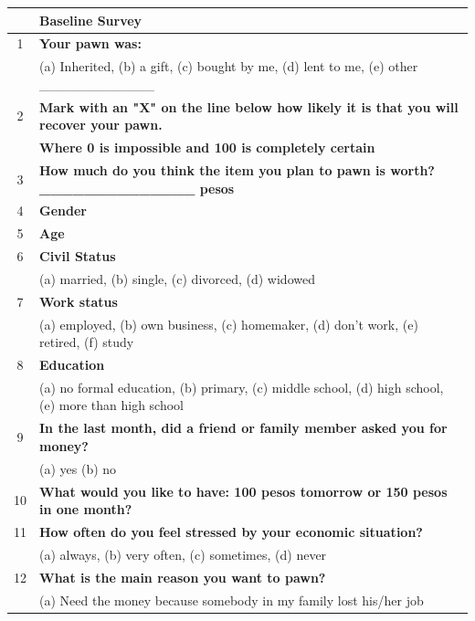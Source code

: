 \begin{tabular}{cl}
\toprule
      & \textbf{Baseline Survey} \\
\midrule
\midrule
1     & \textbf{Your pawn was:} \\
      & (a) Inherited, (b) a gift, (c) bought by me, (d) lent to me, (e) other \_\_\_\_\_\_\_\_\_\_\_\_ \\
\rowcolor[rgb]{ .682,  .667,  .667} 2     & \textbf{Mark with an "X" on the line below how likely it is that you will recover your pawn. } \\
      & \textbf{Where 0 is impossible and 100 is completely certain} \\
\rowcolor[rgb]{ .682,  .667,  .667} 3     & \textbf{How much do you think the item you plan to pawn is worth?       \_\_\_\_\_\_\_\_\_\_\_\_\_\_ pesos} \\
\rowcolor[rgb]{ .682,  .667,  .667} 4     & \textbf{Gender      } \\
\rowcolor[rgb]{ .682,  .667,  .667} 5     & \textbf{Age} \\
6     & \textbf{Civil Status } \\
      & (a) married, (b) single, (c) divorced, (d) widowed \\
7     & \textbf{Work status} \\
      & (a) employed, (b) own business, (c) homemaker, (d) don't work, (e) retired, (f) study \\
\rowcolor[rgb]{ .682,  .667,  .667} 8     & \textbf{Education} \\
      & (a) no formal education, (b) primary, (c) middle school, (d) high school, (e) more than high school \\
\rowcolor[rgb]{ .682,  .667,  .667} 9     & \textbf{In the last month, did a friend or family member asked you for money?} \\
      & (a) yes  (b) no \\
\rowcolor[rgb]{ .682,  .667,  .667} 10    & \textbf{What would you like to have: 100 pesos tomorrow or 150 pesos in one month?} \\
\rowcolor[rgb]{ .682,  .667,  .667} 11    & \textbf{How often do you feel stressed by your economic situation?} \\
      & (a) always, (b) very often, (c) sometimes, (d) never \\
12    & \textbf{What is the main reason you want to pawn?} \\
      & (a) Need the money because somebody in my family lost his/her job \\

\end{tabular}
